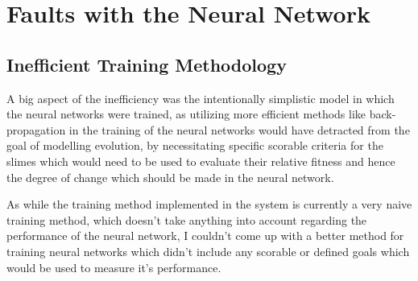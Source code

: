 \section{Faults with the Neural Network}
\subsection{Inefficient Training Methodology}
A big aspect of the inefficiency was the intentionally simplistic model in which the neural networks were trained, as utilizing more efficient methods like back-propagation in the training of the neural networks would have detracted from the goal of modelling evolution, by necessitating specific scorable criteria for the slimes which would need to be used to evaluate their relative fitness and hence the degree of change which should be made in the neural network.
\par
As while the training method implemented in the system is currently a very naive training method, which doesn't take anything into account regarding the performance of the neural network, I couldn't come up with a better method for training neural networks which didn't include any scorable or defined goals which would be used to measure it's performance.
